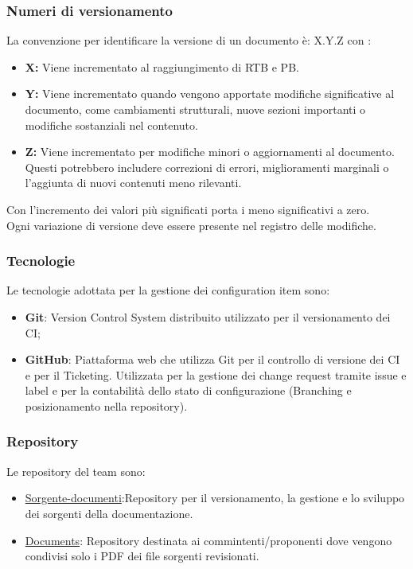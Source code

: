 \documentclass{article}
\begin{document}
\subsubsection{Numeri di versionamento}\label{sec:versionamento}
 La convenzione per identificare la versione di un documento è: X.Y.Z
con :
\begin{itemize}
\item \textbf{X: }Viene incrementato al raggiungimento di RTB e PB.
 \item \textbf{Y: }Viene incrementato quando vengono apportate modifiche significative al documento, come cambiamenti strutturali, nuove sezioni importanti o modifiche sostanziali nel contenuto.
 \item \textbf{Z: }Viene incrementato per modifiche minori o aggiornamenti al documento. Questi potrebbero includere correzioni di errori, miglioramenti marginali o l'aggiunta di nuovi contenuti meno rilevanti.
\end{itemize}

Con l'incremento dei valori più significati  porta i meno significativi a zero. \\
Ogni variazione di versione deve essere presente nel registro delle modifiche.
\subsubsection{Tecnologie}
Le tecnologie adottata per la gestione dei configuration item sono:
\begin{itemize}
    \item \textbf{Git}: Version Control System distribuito utilizzato per il versionamento dei CI;
    \item \textbf{GitHub}: Piattaforma web che utilizza Git per il controllo di versione dei CI e per il Ticketing.
                           Utilizzata per la gestione dei change request tramite issue e label e per la contabilità dello stato di configurazione (Branching e posizionamento nella repository).
\end{itemize}

\subsubsection{Repository}
Le repository del team sono:
    \begin{itemize}
        \item \href{https://github.com/ByteOps-swe/Sorgente-documenti}{Sorgente-documenti}:Repository per il versionamento, la gestione e lo sviluppo dei sorgenti della documentazione.
        \item \href{https://github.com/ByteOps-swe/Documents}{Documents}: Repository destinata ai commintenti/proponenti dove vengono condivisi solo i PDF dei file sorgenti revisionati.  
    \end{itemize}
\end{document}
